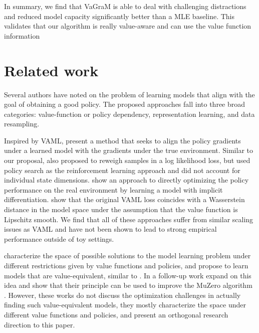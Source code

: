 In summary, we find that VaGraM is able to deal with challenging distractions and reduced model capacity significantly better than a MLE baseline. This validates that our algorithm is really value-aware and can use the value function information 

\section{Related work}

Several authors have noted on the problem of learning models that align with the goal of obtaining a good policy. The proposed approaches fall into three broad categories: value-function or policy dependency, representation learning, and data resampling.

Inspired by VAML, \cite{abachi2020policy} present a method that seeks to align the policy gradients under a learned model with the gradients under the true environment. Similar to our proposal, \cite{doro2020gradient} also proposed to reweigh samples in a log likelihood loss, but used policy search as the reinforcement learning approach and did not account for individual state dimensions. \cite{nikishin2021control} show an approach to directly optimizing the policy performance on the real environment by learning a model with implicit differentiation. \cite{asadi2018equivalence} show that the original VAML loss coincides with a Wasserstein distance in the model space under the assumption that the value function is Lipschitz smooth. We find that all of these approaches suffer from similar scaling issues as VAML and have not been shown to lead to strong empirical performance outside of toy settings.

\cite{grimm2020value} characterize the space of possible solutions to the model learning problem under different restrictions given by value functions and policies, and propose to learn models that are value-equivalent, similar to \cite{vaml}. In a follow-up work \cite{grimm2021proper} expand on this idea and show that their principle can be used to improve the MuZero algorithm \parencite{schrittwieser2020mastering}. However, these works do not discuss the optimization challenges in actually finding such value-equivalent models, they mostly characterize the space under different value functions and policies, and present an orthogonal research direction to this paper.

